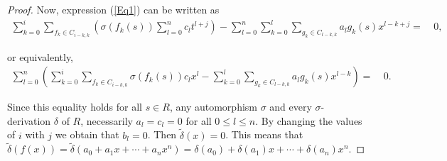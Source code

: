 \documentclass[10pt,a4paper]{amsart}
\begin{document}
\begin{proof}
Now, expression {\rm (}\ref{Eq1}{\rm )} can be written as
\begin{align*}
\sum_{k=0}^{i}\sum_{f_k\in C_{i-k,k}}\left(\sigma(f_k(s))\sum_{l=0}^{n}c_lt^{l+j}\right)-\sum_{l=0}^{n}\sum_{k=0}^l\sum_{g_k\in C_{l-k,k}}a_lg_k(s)x^{l-k+j} = &\ 0,
\end{align*}

or equivalently, 
\begin{align*}
\sum_{l=0}^{n}\left(\sum_{k=0}^{i}\sum_{f_k\in C_{i-k,k}}\sigma(f_k(s))c_lx^{l}-\sum_{k=0}^l\sum_{g_k\in C_{l-k,k}}a_lg_k(s)x^{l-k}\right) = &\ 0.
\end{align*}

Since this equality holds for all $s\in R$, any automorphism $\sigma$ and every $\sigma$-derivation $\delta$ of $R$, necessarily $a_l=c_l=0$ for all $0\leq l \leq n$. By changing the values of $i$ with $j$ we obtain that $b_l=0$. Then $\widetilde{\delta}(x)=0$. This means that 
$\widetilde{\delta}(f(x))=\widetilde{\delta}(a_0+a_1x+ \cdots +a_nx^n)=\delta(a_0)+\delta(a_1)x+ \cdots + \delta(a_n)x^n$.
\end{proof}
\end{document}
